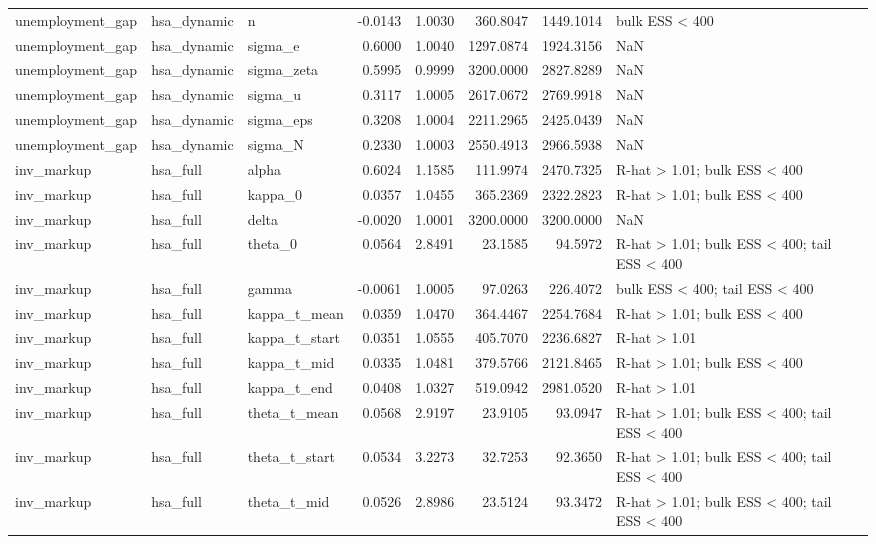 \begin{tabular}{lllrrrrl}
unemployment\_gap & hsa\_dynamic & n & -0.0143 & 1.0030 & 360.8047 & 1449.1014 & bulk ESS < 400 \\
unemployment\_gap & hsa\_dynamic & sigma\_e & 0.6000 & 1.0040 & 1297.0874 & 1924.3156 & NaN \\
unemployment\_gap & hsa\_dynamic & sigma\_zeta & 0.5995 & 0.9999 & 3200.0000 & 2827.8289 & NaN \\
unemployment\_gap & hsa\_dynamic & sigma\_u & 0.3117 & 1.0005 & 2617.0672 & 2769.9918 & NaN \\
unemployment\_gap & hsa\_dynamic & sigma\_eps & 0.3208 & 1.0004 & 2211.2965 & 2425.0439 & NaN \\
unemployment\_gap & hsa\_dynamic & sigma\_N & 0.2330 & 1.0003 & 2550.4913 & 2966.5938 & NaN \\
inv\_markup & hsa\_full & alpha & 0.6024 & 1.1585 & 111.9974 & 2470.7325 & R-hat > 1.01; bulk ESS < 400 \\
inv\_markup & hsa\_full & kappa\_0 & 0.0357 & 1.0455 & 365.2369 & 2322.2823 & R-hat > 1.01; bulk ESS < 400 \\
inv\_markup & hsa\_full & delta & -0.0020 & 1.0001 & 3200.0000 & 3200.0000 & NaN \\
inv\_markup & hsa\_full & theta\_0 & 0.0564 & 2.8491 & 23.1585 & 94.5972 & R-hat > 1.01; bulk ESS < 400; tail ESS < 400 \\
inv\_markup & hsa\_full & gamma & -0.0061 & 1.0005 & 97.0263 & 226.4072 & bulk ESS < 400; tail ESS < 400 \\
inv\_markup & hsa\_full & kappa\_t\_mean & 0.0359 & 1.0470 & 364.4467 & 2254.7684 & R-hat > 1.01; bulk ESS < 400 \\
inv\_markup & hsa\_full & kappa\_t\_start & 0.0351 & 1.0555 & 405.7070 & 2236.6827 & R-hat > 1.01 \\
inv\_markup & hsa\_full & kappa\_t\_mid & 0.0335 & 1.0481 & 379.5766 & 2121.8465 & R-hat > 1.01; bulk ESS < 400 \\
inv\_markup & hsa\_full & kappa\_t\_end & 0.0408 & 1.0327 & 519.0942 & 2981.0520 & R-hat > 1.01 \\
inv\_markup & hsa\_full & theta\_t\_mean & 0.0568 & 2.9197 & 23.9105 & 93.0947 & R-hat > 1.01; bulk ESS < 400; tail ESS < 400 \\
inv\_markup & hsa\_full & theta\_t\_start & 0.0534 & 3.2273 & 32.7253 & 92.3650 & R-hat > 1.01; bulk ESS < 400; tail ESS < 400 \\
inv\_markup & hsa\_full & theta\_t\_mid & 0.0526 & 2.8986 & 23.5124 & 93.3472 & R-hat > 1.01; bulk ESS < 400; tail ESS < 400 \\

\end{tabular}
